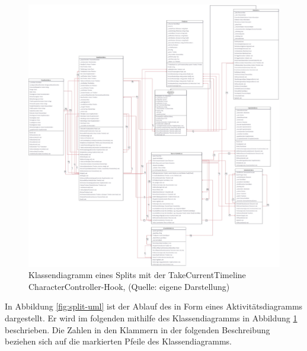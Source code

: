 \begin{figure}[ht]
\centering
\includegraphics[width=1\linewidth]{content/pictures/Split_Class.jpg}
\caption{Klassendiagramm eines Splits mit der TakeCurrentTimeline CharacterController-Hook, (Quelle: eigene Darstellung)}
\label{fig:split-class}
\end{figure}

In Abbildung \ref{fig:split-uml} ist der Ablauf des  in Form eines Aktivitätsdiagramms dargestellt. Er wird im folgenden mithilfe des Klassendiagramms in Abbildung \ref{fig:split-class} beschrieben. Die Zahlen in den Klammern in der folgenden Beschreibung beziehen sich auf die markierten Pfeile des Klassendiagramms.


